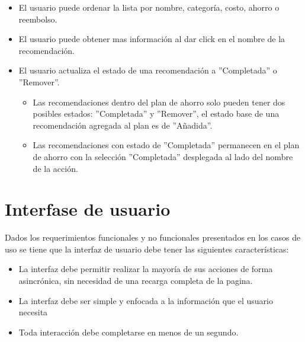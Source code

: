 \begin{usecase}
{\begin{itemize}
\begin{itemize}
      \item El sistema debe indicar que la lista de recomendaciones es el plan
        de ahorro.
      \item El usuario puede agregar mas recomendaciones desde la lista de
        recomendaciones, cuando se añade una recomendación esta solamente es
        visible en el plan de ahorro ya no debe de aparecer en la lista de
        recomendaciones
      \item El usuario puede remover recomendaciones de su plan seleccionando
        ''Remover del plan'' en un menú desplegable al lado del nombre de la
        acción.
      \end{itemize}
    \item El usuario puede ordenar la lista por nombre, categoría, costo, ahorro
      o reembolso.
    \item El usuario puede obtener mas información al dar click en el nombre
      de la recomendación.
    \item El usuario actualiza el estado de una recomendación a ''Completada''
      o ''Remover''.
      \begin{itemize}
      \item Las recomendaciones dentro del plan de ahorro solo pueden tener
        dos posibles estados: ''Completada'' y ''Remover'', el estado base
        de una recomendación agregada al plan es de ''Añadida''.
      \item Las recomendaciones con estado de ''Completada'' permanecen
        en el plan de ahorro con la selección ''Completada'' desplegada
        al lado del nombre de la acción.
      \end{itemize}
    \end{itemize}
  }
\end{usecase}

\section{Interfase de usuario}

Dados los requerimientos funcionales y no funcionales presentados en los
casos de uso se tiene que la interfaz de usuario debe tener las siguientes
características:

\begin{itemize}
\item La interfaz debe permitir realizar la mayoría de sus
  acciones de forma asincrónica, sin necesidad de una recarga completa de
  la pagina.
\item La interfaz debe ser simple y enfocada a la información que el
  usuario necesita
\item Toda interacción debe completarse en menos de un segundo.
\end{itemize}

